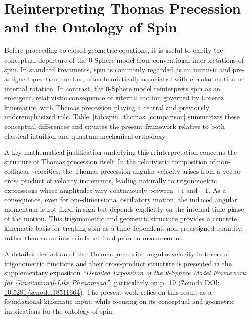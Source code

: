 \documentclass[12pt,letterpaper]{article}
\begin{document}
\section{Reinterpreting Thomas Precession and the Ontology of Spin}

Before proceeding to closed geometric equations, it is useful to clarify the conceptual departure of the 0-Sphere model from conventional interpretations of spin. 
In standard treatments, spin is commonly regarded as an intrinsic and pre-assigned quantum number, often heuristically associated with circular motion or internal rotation. 
In contrast, the 0-Sphere model reinterprets spin as an emergent, relativistic consequence of internal motion governed by Lorentz kinematics, with Thomas precession playing a central and previously underemphasized role. 
Table~\ref{tab:spin_thomas_comparison} summarizes these conceptual differences and situates the present framework relative to both classical intuition and quantum-mechanical orthodoxy.

A key mathematical justification underlying this reinterpretation concerns the structure of Thomas precession itself. 
In the relativistic composition of non-collinear velocities, the Thomas precession angular velocity arises from a vector cross product of velocity increments, leading naturally to trigonometric expressions whose amplitudes vary continuously between $+1$ and $-1$. 
As a consequence, even for one-dimensional oscillatory motion, the induced angular momentum is not fixed in sign but depends explicitly on the internal time phase of the motion. 
This trigonometric and geometric structure provides a concrete kinematic basis for treating spin as a time-dependent, non-preassigned quantity, rather than as an intrinsic label fixed prior to measurement.

A detailed derivation of the Thomas precession angular velocity in terms of trigonometric functions and their cross-product structure is presented in the supplementary exposition
\emph{``Detailed Exposition of the 0-Sphere Model Framework for Gravitational-Like Phenomena''}, particularly on p.~19
(\href{https://doi.org/10.5281/zenodo.18511664}{Zenodo DOI: 10.5281/zenodo.18511664}). 
The present work relies on this result as a foundational kinematic input, while focusing on its conceptual and geometric implications for the ontology of spin.


\end{document}
